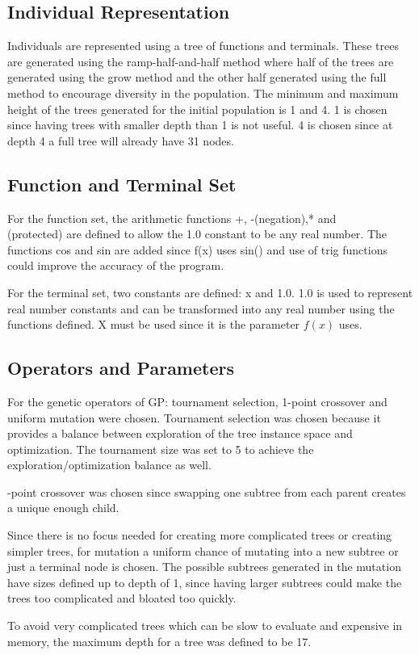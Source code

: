 \documentclass{article}
\begin{document}
\subsection*{Individual Representation}
Individuals are represented using a tree of functions and terminals. These trees are generated using the ramp-half-and-half method where half of the trees are generated using the grow method and the other half generated using the full method to encourage diversity in the population. The minimum and maximum height of the trees generated for the initial population is 1 and 4. 1 is chosen since having trees with smaller depth than 1 is not useful. 4 is chosen since at depth 4 a full tree will already have 31 nodes.
\subsection*{Function and Terminal Set}
For the function set, the arithmetic functions +, -(negation),* and \\(protected) are defined to allow the 1.0 constant to be any real number. The functions cos and sin are added since f(x) uses sin() and use of trig functions could improve the accuracy of the program. \par
\noindent For the terminal set, two constants are defined: x and 1.0. 1.0 is used to represent real number constants and can be transformed into any real number using the functions defined. X must be used since it is the parameter $f(x)$ uses.
\subsection*{Operators and Parameters}
For the genetic operators of GP: tournament selection, 1-point crossover and uniform mutation were chosen. Tournament selection was chosen because it provides a balance between exploration of the tree instance space and optimization. The tournament size was set to 5 to achieve the exploration/optimization balance as well. \par
{}-point crossover was chosen since swapping one subtree from each parent creates a unique enough child. \par 
\noindent Since there is no focus needed for creating more complicated trees or creating simpler trees, for mutation a uniform chance of mutating into a new subtree or just a terminal node is chosen. The possible subtrees generated in the mutation have sizes defined up to depth of 1, since having larger subtrees could make the trees too complicated and bloated too quickly. \par
\noindent To avoid very complicated trees which can be slow to evaluate and expensive in memory, the maximum depth for a tree was defined to be 17. 
\end{document}
